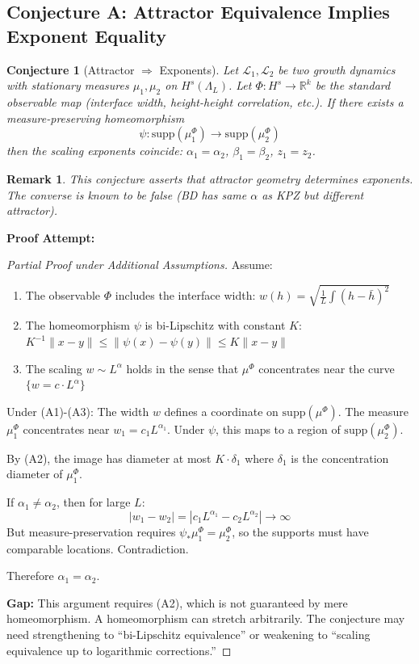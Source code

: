 \documentclass[11pt]{article}
\newtheorem{conjecture}{Conjecture}[section]
\newtheorem{remark}{Remark}[section]
\newcommand{\R}{\mathbb{R}}
\newcommand{\supp}{\mathrm{supp}}
\begin{document}
\subsection{Conjecture A: Attractor Equivalence Implies Exponent Equality}

\begin{conjecture}[Attractor $\Rightarrow$ Exponents]
\label{conj:attractor-exponents}
Let $\mathcal{L}_1, \mathcal{L}_2$ be two growth dynamics with stationary measures $\mu_1, \mu_2$ on $H^s(\Lambda_L)$. Let $\Phi: H^s \to \R^k$ be the standard observable map (interface width, height-height correlation, etc.). If there exists a measure-preserving homeomorphism
\[
\psi: \supp(\mu_1^\Phi) \to \supp(\mu_2^\Phi)
\]
then the scaling exponents coincide: $\alpha_1 = \alpha_2$, $\beta_1 = \beta_2$, $z_1 = z_2$.
\end{conjecture}

\begin{remark}
This conjecture asserts that attractor geometry determines exponents. The converse is known to be false (BD has same $\alpha$ as KPZ but different attractor).
\end{remark}

\textbf{Proof Attempt:}

\begin{proof}[Partial Proof under Additional Assumptions]
Assume:
\begin{enumerate}
\item[(A1)] The observable $\Phi$ includes the interface width: $w(h) = \sqrt{\frac{1}{L}\int (h - \bar{h})^2}$
\item[(A2)] The homeomorphism $\psi$ is bi-Lipschitz with constant $K$: $K^{-1}\|x-y\| \leq \|\psi(x) - \psi(y)\| \leq K\|x-y\|$
\item[(A3)] The scaling $w \sim L^\alpha$ holds in the sense that $\mu^\Phi$ concentrates near the curve $\{w = c \cdot L^\alpha\}$
\end{enumerate}

Under (A1)-(A3): The width $w$ defines a coordinate on $\supp(\mu^\Phi)$. The measure $\mu_1^\Phi$ concentrates near $w_1 = c_1 L^{\alpha_1}$. Under $\psi$, this maps to a region of $\supp(\mu_2^\Phi)$.

By (A2), the image has diameter at most $K \cdot \delta_1$ where $\delta_1$ is the concentration diameter of $\mu_1^\Phi$. 

If $\alpha_1 \neq \alpha_2$, then for large $L$:
\[
|w_1 - w_2| = |c_1 L^{\alpha_1} - c_2 L^{\alpha_2}| \to \infty
\]
But measure-preservation requires $\psi_*\mu_1^\Phi = \mu_2^\Phi$, so the supports must have comparable locations. Contradiction.

Therefore $\alpha_1 = \alpha_2$.

\textbf{Gap:} This argument requires (A2), which is not guaranteed by mere homeomorphism. A homeomorphism can stretch arbitrarily. The conjecture may need strengthening to ``bi-Lipschitz equivalence'' or weakening to ``scaling equivalence up to logarithmic corrections.''
\end{proof}
\end{document}
